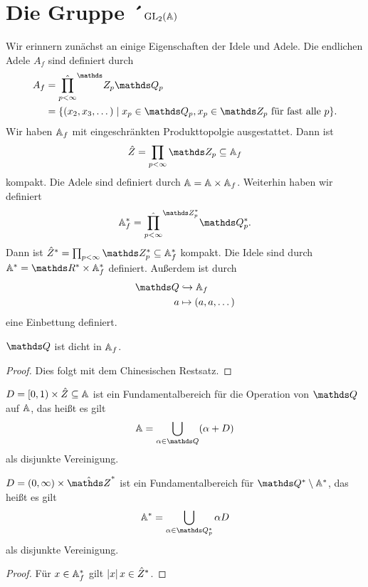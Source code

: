 \chapter{Die Gruppe ´$\operatorname{GL}_2(\mathbb{A})$}
Wir erinnern zunächst an einige Eigenschaften der Idele und Adele.
Die endlichen Adele $A_f$ sind definiert durch
\begin{align*}
A_f&=\hat{\prod_{p<\infty}}^\Z_p \Q_p\\
&=\{(x_2,x_3,\dots) \mid x_p \in \Q_p, x_p\in \Z_p \text{ für fast alle } p\}.
\end{align*}
Wir haben $\mathbb{A}_f$ mit eingeschränkten Produkttopolgie ausgestattet.
Dann ist
\begin{align*}
\hat{Z}=\prod_{p <\infty} \Z_p \subseteq \A_f
\end{align*}
kompakt.
Die Adele sind definiert durch $\mathbb{A}=\mathbb{A} \times \mathbb{A}_f$.
Weiterhin haben wir definiert
\begin{align*}
\A_f^\ast= \hat{\prod_{p<\infty}}^{\Z_p^\ast} \Q_p^\ast.
\end{align*}
Dann ist $\hat{Z}^\ast=\prod_{p<\infty} \Z_p^\ast \subseteq \A_f^\ast$ kompakt.
Die Idele sind durch $\A^\ast=\R^\ast \times \A_f^\ast$ definiert.
Außerdem ist durch
\begin{align*}
\Q &\hookrightarrow \A_f\\
a&\mapsto (a,a,\dots)
\end{align*}
eine Einbettung definiert.
\begin{prop}
$\Q$ ist dicht in $\mathbb{A}_f$.
\end{prop}
\begin{proof}
Dies folgt mit dem Chinesischen Restsatz.
\end{proof}
\begin{prop}
$D=[0,1)\times \hat{Z}\subseteq \mathbb{A}$ ist ein Fundamentalbereich für die
Operation von $\Q$ auf $\mathbb{A}$, das heißt es gilt
\begin{align*}
\A=\bigcup_{\alpha\in \Q} (\alpha+D)
\end{align*}
als disjunkte Vereinigung.
\end{prop}

\begin{prop}
$D=(0,\infty)\times\hat{\Z}^*$ ist ein Fundamentalbereich für $\Q^\ast \setminus \A^\ast$, das heißt es gilt
\begin{align*}
\A^\ast=\bigcup_{\alpha\in \Q_p^\ast} \alpha D
\end{align*}
als disjunkte Vereinigung.
\end{prop}
\begin{proof}
Für $x\in \mathbb{A}_f^\ast$ gilt $\left\vert x\right\vert x\in \hat{Z}^\ast$.
\end{proof}

